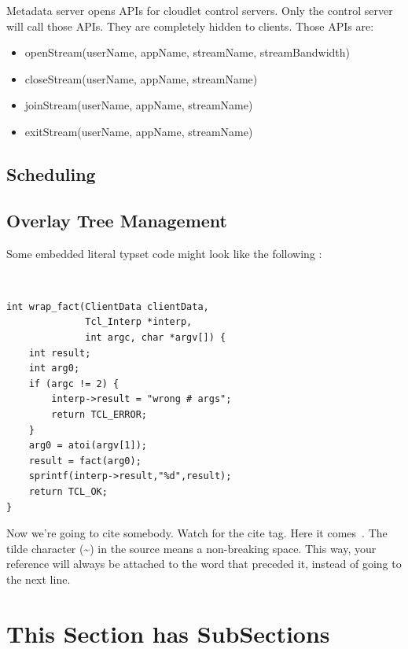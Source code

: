 \documentclass[letterpaper,twocolumn,10pt]{article}
\begin{document}
Metadata server opens APIs for cloudlet control servers. Only the control server will call those APIs. They are completely hidden to clients. Those APIs are:

\begin{itemize}
  \item openStream(userName, appName, streamName, streamBandwidth)
  \item closeStream(userName, appName, streamName)
  \item joinStream(userName, appName, streamName)
  \item exitStream(userName, appName, streamName)
\end{itemize}

\subsection{Scheduling}

\subsection{Overlay Tree Management}








Some embedded literal typset code might 
look like the following :


{\tt \small
\begin{verbatim}
int wrap_fact(ClientData clientData,
              Tcl_Interp *interp,
              int argc, char *argv[]) {
    int result;
    int arg0;
    if (argc != 2) {
        interp->result = "wrong # args";
        return TCL_ERROR;
    }
    arg0 = atoi(argv[1]);
    result = fact(arg0);
    sprintf(interp->result,"%d",result);
    return TCL_OK;
}
\end{verbatim}
}

Now we're going to cite somebody.  Watch for the cite tag.
Here it comes~\cite{Chaum1981,Diffie1976}.  The tilde character (\~{})
in the source means a non-breaking space.  This way, your reference will
always be attached to the word that preceded it, instead of going to the
next line.

\section{This Section has SubSections}
\end{document}
